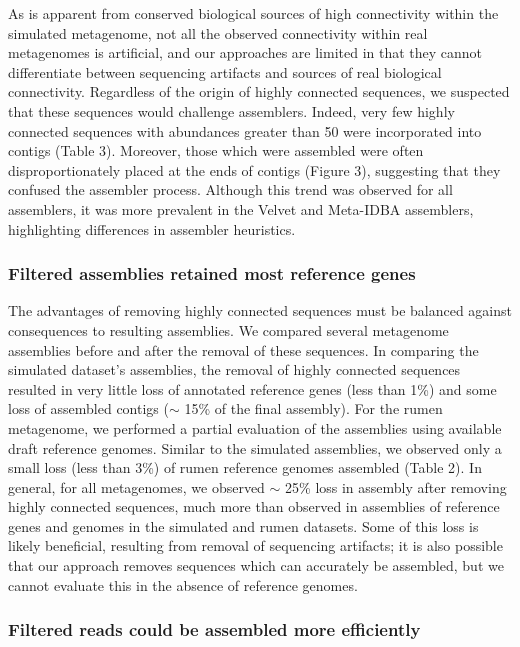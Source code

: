 \documentclass[10pt]{article}
\begin{document}
As is apparent from conserved biological sources of high connectivity
within the simulated metagenome, not all the observed connectivity
within real metagenomes is artificial, and our approaches are limited
in that they cannot differentiate between sequencing artifacts and
sources of real biological connectivity.  Regardless of the origin of
highly connected sequences, we suspected that these sequences would
challenge assemblers.  Indeed, very few highly connected sequences with
abundances greater than 50 were incorporated into contigs (Table
3). Moreover, those which were assembled were often disproportionately placed
at the ends of contigs (Figure 3), suggesting that they confused the
assembler process.  Although this trend was
observed for all assemblers, it was more prevalent in the Velvet and
Meta-IDBA assemblers, highlighting differences in assembler
heuristics.

\subsubsection*{Filtered assemblies retained most reference genes}

The advantages of removing highly connected sequences must be balanced
against consequences to resulting assemblies.  We compared several
metagenome assemblies before and after the removal of these sequences.
In comparing the simulated dataset's assemblies, the removal of highly
connected sequences resulted in very little loss of annotated
reference genes (less than 1\%) and some loss of assembled contigs ($\sim$ 15\% of the final assembly).  For the rumen metagenome, we performed a partial
evaluation of the assemblies using available draft reference genomes.
Similar to the simulated assemblies, we observed only a small loss
(less than 3\%) of rumen reference genomes assembled (Table 2).  In
general, for all metagenomes, we observed $\sim$ 25\% loss in assembly after
removing highly connected sequences, much more than observed in
assemblies of reference genes and genomes in the simulated and rumen
datasets.  Some of this loss is likely beneficial, resulting from
removal of sequencing artifacts; it is also possible that our approach
removes sequences which can accurately be assembled, but we cannot
evaluate this in the absence of reference genomes.

\subsubsection*{Filtered reads could be assembled more efficiently}
\end{document}
